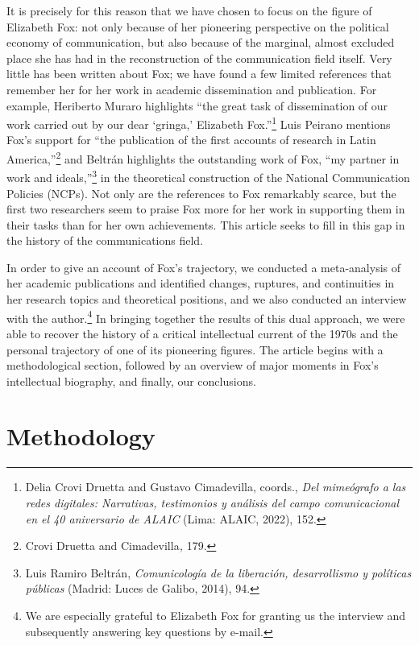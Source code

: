 \documentclass{tufte-handout}
\begin{document}
It is precisely for this reason that we have chosen to focus on the
figure of Elizabeth Fox: not only because of her pioneering perspective
on the political economy of communication, but also because of the
marginal, almost excluded place she has had in the reconstruction of the
communication field itself. Very little has been written about Fox; we
have found a few limited references that remember her for her work in
academic dissemination and publication. For example, Heriberto Muraro
highlights ``the great task of dissemination of our work carried out by
our dear `gringa,' Elizabeth Fox.''\footnote{Delia Crovi Druetta and
  Gustavo Cimadevilla, coords., \emph{Del mimeógrafo a las redes
  digitales: Narrativas, testimonios y análisis del campo comunicacional
  en el 40 aniversario de ALAIC} (Lima: ALAIC, 2022), 152.} Luis Peirano
mentions Fox's support for ``the publication of the first accounts of
research in Latin America,''\footnote{Crovi Druetta and
  Cimadevilla\emph{,} 179.} and Beltrán highlights the outstanding work
of Fox, ``my partner in work and ideals,''\footnote{Luis Ramiro Beltrán,
  \emph{Comunicología de la liberación, desarrollismo y políticas
  públicas} (Madrid: Luces de Galibo, 2014), 94.} in the theoretical
construction of the National Communication Policies (NCPs). Not only are
the references to Fox remarkably scarce, but the first two researchers
seem to praise Fox more for her work in supporting them in their tasks
than for her own achievements. This article seeks to fill in this gap in
the history of the communications field.

In order to give an account of Fox's trajectory, we conducted a
meta-analysis of her academic publications and identified changes,
ruptures, and continuities in her research topics and theoretical
positions, and we also conducted an interview with the
author.\footnote{We are especially grateful to Elizabeth Fox for
  granting us the interview and subsequently answering key questions by
  e-mail.} In bringing together the results of this dual approach, we
were able to recover the history of a critical intellectual current of
the 1970s and the personal trajectory of one of its pioneering figures.
The article begins with a methodological section, followed by an
overview of major moments in Fox's intellectual biography, and finally,
our conclusions.

\hypertarget{methodology}{%
\section{Methodology}\label{methodology}}
\end{document}
